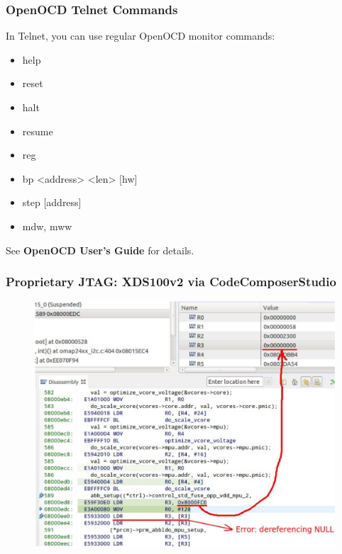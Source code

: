 \begin{frame}[containsverbatim]
  \frametitle{OpenOCD Telnet Commands}
  In Telnet, you can use regular OpenOCD monitor commands:
  \begin{itemize}
    \item help
    \item reset
    \item halt
    \item resume
    \item reg
    \item bp <address> <len> [hw]
    \item step [address]
    \item mdw, mww
  \end{itemize}
  See \textbf{OpenOCD User's Guide} for details.
\end{frame}

\begin{frame}
  \frametitle{Proprietary JTAG: XDS100v2 via CodeComposerStudio}
  \begin{figure}
    \centering
    \includegraphics[scale=0.32]{images/uboot-jtag.png}
  \end{figure}
  \vspace*{-10mm}
\end{frame}


